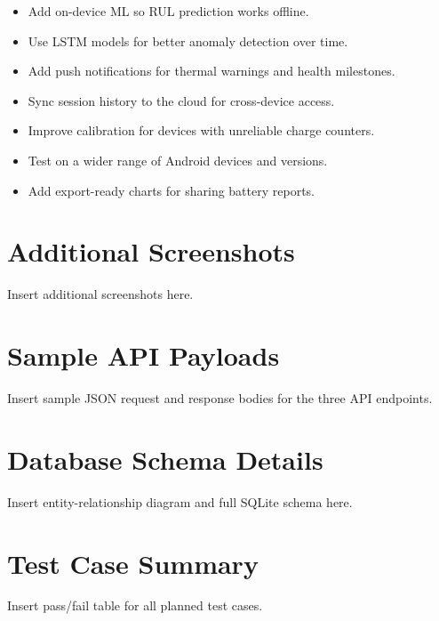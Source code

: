 \documentclass[12pt,a4paper]{report}
\begin{document}
\begin{itemize}[leftmargin=1.5em]
  \item Add on-device ML so RUL prediction works offline.
  \item Use LSTM models for better anomaly detection over time.
  \item Add push notifications for thermal warnings and health milestones.
  \item Sync session history to the cloud for cross-device access.
  \item Improve calibration for devices with unreliable charge counters.
  \item Test on a wider range of Android devices and versions.
  \item Add export-ready charts for sharing battery reports.
\end{itemize}

\appendix
\chapter{Additional Screenshots}

Insert additional screenshots here.

\chapter{Sample API Payloads}

Insert sample JSON request and response bodies for the three API endpoints.

\chapter{Database Schema Details}

Insert entity-relationship diagram and full SQLite schema here.

\chapter{Test Case Summary}

Insert pass/fail table for all planned test cases.

\end{document}
